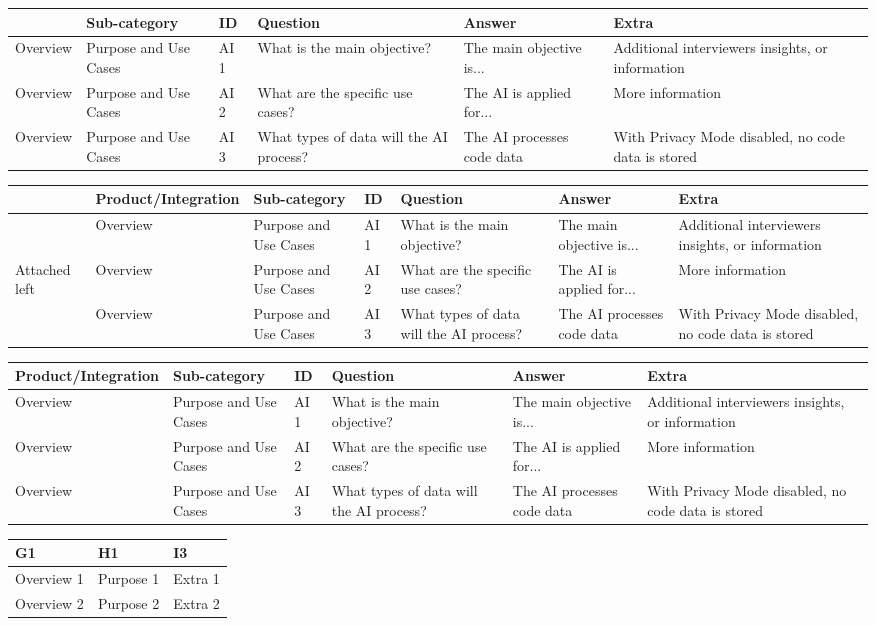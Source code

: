 \documentclass[11pt,a4paper]{article}
\begin{document}
\begin{table}[h]
\begin{tabular}{|l|l|l|l|l|l|}
\hline
 & Sub-category & ID & Question & Answer & Extra \\ \hline
Overview & Purpose and Use Cases & AI 1 & What is the main objective? & The main objective is... & Additional interviewers insights, or information \\ \hline
Overview & Purpose and Use Cases & AI 2 & What are the specific use cases? & The AI is applied for... & More information \\ \hline
Overview & Purpose and Use Cases & AI 3 & What types of data will the AI process? & The AI processes code data & With Privacy Mode disabled, no code data is stored \\ \hline
\end{tabular}
\end{table}

\begin{table}[h]
\begin{tabular}{|l|l|l|l|l|l|l|}
\hline
 & Product/Integration & Sub-category & ID & Question & Answer & Extra \\ \hline
 & Overview & Purpose and Use Cases & AI 1 & What is the main objective? & The main objective is... & Additional interviewers insights, or information \\ \hline
Attached left & Overview & Purpose and Use Cases & AI 2 & What are the specific use cases? & The AI is applied for... & More information \\ \hline
 & Overview & Purpose and Use Cases & AI 3 & What types of data will the AI process? & The AI processes code data & With Privacy Mode disabled, no code data is stored \\ \hline
\end{tabular}
\end{table}

\begin{table}[h]
\begin{tabular}{|l|l|l|l|l|l|}
\hline
Product/Integration & Sub-category & ID & Question & Answer & Extra \\ \hline
Overview & Purpose and Use Cases & AI 1 & What is the main objective? & The main objective is... & Additional interviewers insights, or information \\ \hline
Overview & Purpose and Use Cases & AI 2 & What are the specific use cases? & The AI is applied for... & More information \\ \hline
Overview & Purpose and Use Cases & AI 3 & What types of data will the AI process? & The AI processes code data & With Privacy Mode disabled, no code data is stored \\ \hline
\end{tabular}
\end{table}

\begin{table}[h]
\begin{tabular}{|l|l|l|}
\hline
G1 & H1 & I3 \\ \hline
Overview 1 & Purpose 1 & Extra 1 \\ \hline
Overview 2 & Purpose 2 & Extra 2 \\ \hline
\end{tabular}
\end{table}
\end{document}
